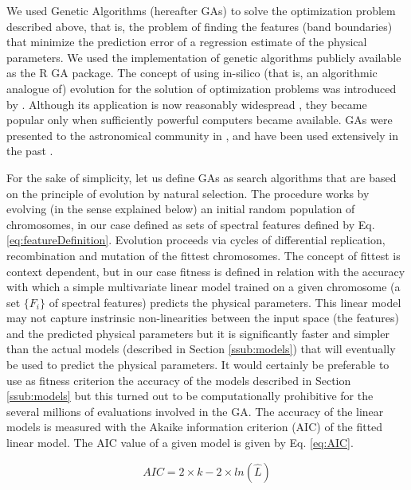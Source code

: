 We used Genetic Algorithms (hereafter GAs) to solve the optimization
problem described above, that is, the problem of finding the features
(band boundaries) that minimize the prediction error of a regression
estimate of the physical parameters. We used the implementation of
genetic algorithms publicly available as the R \citep{R2013} GA
package. The concept of using in-silico (that is, an algorithmic
analogue of) evolution for the solution of optimization problems was
introduced by \cite{holland1975adaptation}. Although its application
is now reasonably widespread \citep[see e.g.][]{goldberg1989genetic},
they became popular only when sufficiently powerful computers became
available. GAs were presented to the astronomical community
in \cite{1995ApJS..101..309C}, and have been used extensively in
the past \citep[see][for a significant application of GAs in
astronomy]{2013A&A...550A..74D}.

For the sake of simplicity, let us define GAs as search algorithms
that are based on the principle of evolution by natural selection. The
procedure works by evolving (in the sense explained below) an initial
random population of chromosomes, in our case defined as sets of
spectral features defined by Eq. \ref{eq:featureDefinition}. Evolution
proceeds via cycles of differential replication, recombination and
mutation of the fittest chromosomes. The concept of fittest is context
dependent, but in our case fitness is defined in relation with the
accuracy with which a simple multivariate linear model trained on a
given chromosome (a set $\{F_i\}$ of spectral features) predicts the
physical parameters. This linear model may not capture instrinsic
non-linearities between the input space (the features) and the
predicted physical parameters but it is significantly faster and
simpler than the actual models (described in
Section \ref{ssub:models}) that will eventually be used to predict the
physical parameters. It would certainly be preferable to use as
fitness criterion the accuracy of the models described in
Section \ref{ssub:models} but this turned out to be computationally
prohibitive for the several millions of evaluations involved in the
GA. The accuracy of the linear models is measured with the Akaike
information criterion (AIC) of the fitted linear model.  The AIC value
of a given model is given by Eq. \ref{eq:AIC}.

\begin{equation}\label{eq:AIC}
  AIC = 2 \times k - 2 \times ln(\hat{L}) 
\end{equation}

